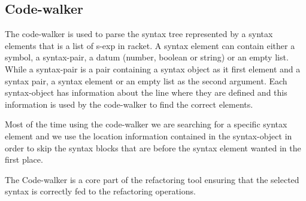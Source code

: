 

\subsection{Code-walker} %
The code-walker is used to parse the syntax tree represented by a syntax elements
that is a list of s-exp in racket. %
A syntax element can contain either a symbol, a syntax-pair, a datum (number, boolean or string)
or an empty list. %
While a syntax-pair is a pair containing a syntax object as it first element and
a syntax pair, a syntax element or an empty list as the second argument.
Each syntax-object has information about the line where they are defined and this
information is used by the code-walker to find the correct elements.


Most of the time using the code-walker we are searching for a specific syntax element
and we use the location information contained in the syntax-object in order to
skip the syntax blocks that are before the syntax element wanted in the first place.

The Code-walker is a core part of the refactoring tool ensuring that the selected
syntax is correctly fed to the refactoring operations.



